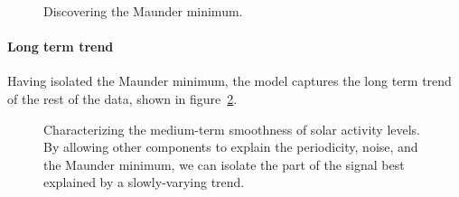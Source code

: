 \documentclass[letterpaper]{article}
\begin{document}
\begin{figure}[ht]
\centering
{}
\caption{Discovering the Maunder minimum.}
\label{fig:maunder}
\end{figure}

\paragraph{Long term trend}

Having isolated the Maunder minimum, the model captures the long term trend of the rest of the data, shown in figure~\ref{fig:smooth}.

\begin{figure}[h!]
\centering
{}
\caption{Characterizing the medium-term smoothness of solar activity levels.  By allowing other components to explain the periodicity, noise, and the Maunder minimum, we can isolate the part of the signal best explained by a slowly-varying trend.}
\label{fig:smooth}
\end{figure}
\end{document}
